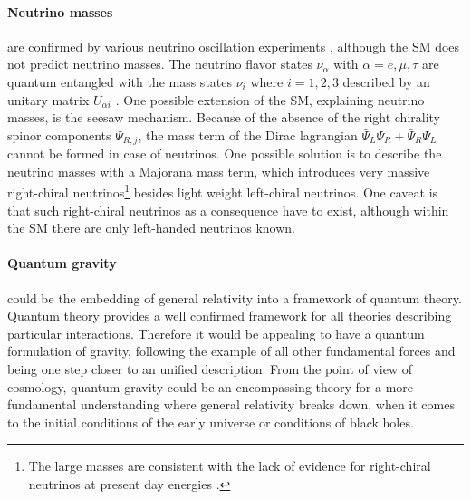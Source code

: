 \paragraph{Neutrino masses} are confirmed by various neutrino oscillation experiments \cite{Kajita}\cite{McDonald}, although the SM does not predict neutrino masses. The neutrino flavor states $\nu_\alpha$ with $\alpha=e,\mu,\tau$ are quantum entangled with the mass states $\nu_i$ where $i=1,2,3$ described by an unitary matrix $U_{\alpha i}$ \cite{mixing}. One possible extension of the SM, explaining neutrino masses, is the seesaw mechanism. Because of the absence of the right chirality spinor components $\Psi_{R,j}$, the mass term of the Dirac lagrangian $\bar{\Psi}_L\Psi_R+\bar{\Psi}_R\Psi_L$ cannot be formed in case of neutrinos. One possible solution is to describe the neutrino masses with a Majorana mass term, which introduces very massive right-chiral neutrinos\footnote{The large masses are consistent with the lack of evidence for right-chiral neutrinos at present day energies \cite{Nair}.} besides light weight left-chiral neutrinos. One caveat is that such right-chiral neutrinos as a consequence have to exist, although within the SM there are only left-handed neutrinos known. \cite{Nair}
\paragraph{Quantum gravity} could be the embedding of general relativity into a framework of quantum theory. Quantum theory provides a well confirmed framework for all theories describing particular interactions. Therefore it would be appealing to have a quantum formulation of gravity, following the example of all other fundamental forces and being one step closer to an unified description. From the point of view of cosmology, quantum gravity could be an encompassing theory for a more fundamental understanding where general relativity breaks down, when it comes to the initial conditions of the early universe or conditions of black holes. \cite{quantumgravity}
